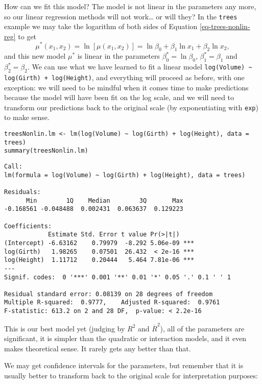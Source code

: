 How can we fit this model? The model is not linear in the parameters
any more, so our linear regression methods will not work\ldots{} or will
they? In the \texttt{trees} example we may take the logarithm of both sides
of Equation \eqref{eq-trees-nonlin-reg} to get
\begin{equation}
\mu^{\ast}(x_{1},x_{2})=\ln\left[\mu(x_{1},x_{2})\right]=\ln\beta_{0}+\beta_{1}\ln x_{1}+\beta_{2}\ln x_{2},
\end{equation}
and this new model \(\mu^{\ast}\) is linear in the parameters
\(\beta_{0}^{\ast}=\ln\beta_{0}\), \(\beta_{1}^{\ast}=\beta_{1}\) and
\(\beta_{2}^{\ast}=\beta_{2}\). We can use what we have learned to fit
a linear model \texttt{log(Volume) \textasciitilde{} log(Girth) + log(Height)}, and
everything will proceed as before, with one exception: we will need to
be mindful when it comes time to make predictions because the model
will have been fit on the log scale, and we will need to transform our
predictions back to the original scale (by exponentiating with \texttt{exp})
to make sense.

\begin{verbatim}
treesNonlin.lm <- lm(log(Volume) ~ log(Girth) + log(Height), data = trees)
summary(treesNonlin.lm)
\end{verbatim}

\begin{verbatim}
Call:
lm(formula = log(Volume) ~ log(Girth) + log(Height), data = trees)

Residuals:
      Min        1Q    Median        3Q       Max 
-0.168561 -0.048488  0.002431  0.063637  0.129223 

Coefficients:
            Estimate Std. Error t value Pr(>|t|)    
(Intercept) -6.63162    0.79979  -8.292 5.06e-09 ***
log(Girth)   1.98265    0.07501  26.432  < 2e-16 ***
log(Height)  1.11712    0.20444   5.464 7.81e-06 ***
---
Signif. codes:  0 '***' 0.001 '**' 0.01 '*' 0.05 '.' 0.1 ' ' 1

Residual standard error: 0.08139 on 28 degrees of freedom
Multiple R-squared:  0.9777,	Adjusted R-squared:  0.9761 
F-statistic: 613.2 on 2 and 28 DF,  p-value: < 2.2e-16
\end{verbatim}

This is our best model yet (judging by \(R^{2}\) and
\(\overline{R}^{2}\)), all of the parameters are significant, it is
simpler than the quadratic or interaction models, and it even makes
theoretical sense. It rarely gets any better than that.

We may get confidence intervals for the parameters, but remember that
it is usually better to transform back to the original scale for
interpretation purposes:

